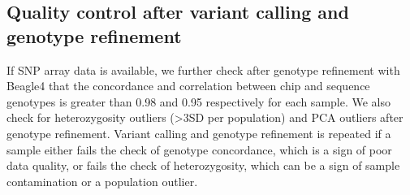 \subsection{Quality control after variant calling and genotype refinement}
If SNP array data is available, we further check after genotype refinement with Beagle4 that the concordance and correlation between chip and sequence genotypes is greater than 0.98 and 0.95 respectively for each sample. We also check for heterozygosity outliers (\textgreater3SD per population) and PCA outliers after genotype refinement. Variant calling and genotype refinement is repeated if a sample either fails the check of genotype concordance, which is a sign of poor data quality, or fails the check of heterozygosity, which can be a sign of sample contamination or a population outlier.